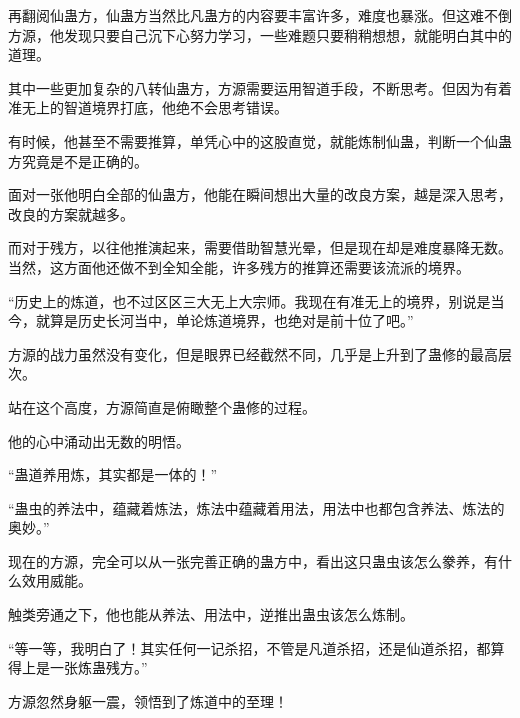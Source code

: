 \begin{this_body}
再翻阅仙蛊方，仙蛊方当然比凡蛊方的内容要丰富许多，难度也暴涨。但这难不倒方源，他发现只要自己沉下心努力学习，一些难题只要稍稍想想，就能明白其中的道理。

其中一些更加复杂的八转仙蛊方，方源需要运用智道手段，不断思考。但因为有着准无上的智道境界打底，他绝不会思考错误。

有时候，他甚至不需要推算，单凭心中的这股直觉，就能炼制仙蛊，判断一个仙蛊方究竟是不是正确的。

面对一张他明白全部的仙蛊方，他能在瞬间想出大量的改良方案，越是深入思考，改良的方案就越多。

而对于残方，以往他推演起来，需要借助智慧光晕，但是现在却是难度暴降无数。当然，这方面他还做不到全知全能，许多残方的推算还需要该流派的境界。

“历史上的炼道，也不过区区三大无上大宗师。我现在有准无上的境界，别说是当今，就算是历史长河当中，单论炼道境界，也绝对是前十位了吧。”

方源的战力虽然没有变化，但是眼界已经截然不同，几乎是上升到了蛊修的最高层次。

站在这个高度，方源简直是俯瞰整个蛊修的过程。

他的心中涌动出无数的明悟。

“蛊道养用炼，其实都是一体的！”

“蛊虫的养法中，蕴藏着炼法，炼法中蕴藏着用法，用法中也都包含养法、炼法的奥妙。”

现在的方源，完全可以从一张完善正确的蛊方中，看出这只蛊虫该怎么豢养，有什么效用威能。

触类旁通之下，他也能从养法、用法中，逆推出蛊虫该怎么炼制。

“等一等，我明白了！其实任何一记杀招，不管是凡道杀招，还是仙道杀招，都算得上是一张炼蛊残方。”

方源忽然身躯一震，领悟到了炼道中的至理！

\end{this_body}

